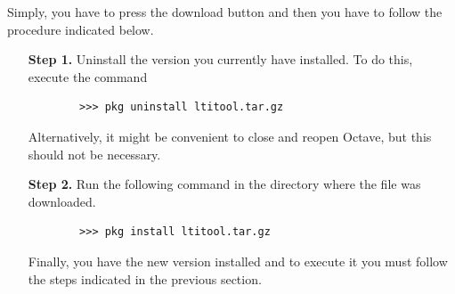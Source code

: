 Simply, you have to press the download button and then you have to follow the procedure indicated  below.
\begin{enumerate}
	\item[\textbf{Step 1.}] Uninstall the version you currently have installed. To do this, execute the command
	\begin{verbatim}
		>>> pkg uninstall ltitool.tar.gz
	\end{verbatim}
	Alternatively, it might be convenient to close and reopen Octave, but this should not be necessary.

	\item[\textbf{Step 2.}] Run the following command in the directory where the file was downloaded.
	\begin{verbatim}
		>>> pkg install ltitool.tar.gz
	\end{verbatim}
	
	Finally, you have the new version installed and to execute it you must follow the steps indicated in the previous section.
\end{enumerate}


 